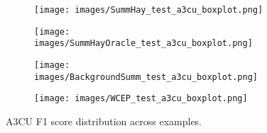 \begin{figure*}[t]
    \centering
    \begin{subfigure}{0.49\textwidth}
    \texttt{[image: images/SummHay\_test\_a3cu\_boxplot.png]}
    \end{subfigure}
    \begin{subfigure}{0.49\textwidth}
    \texttt{[image: images/SummHayOracle\_test\_a3cu\_boxplot.png]}    
    \end{subfigure}
    \begin{subfigure}{0.49\textwidth}
    \texttt{[image: images/BackgroundSumm\_test\_a3cu\_boxplot.png]}
    \end{subfigure}
    \begin{subfigure}{0.49\textwidth}
    \texttt{[image: images/WCEP\_test\_a3cu\_boxplot.png]}
    \end{subfigure}
    \caption{A3CU F1 score distribution across examples.}
    \label{fig:box_a3cu}
\end{figure*}
